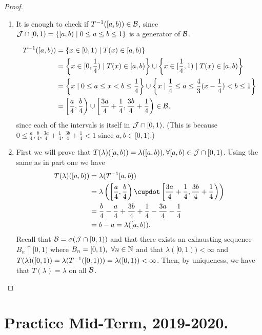 \begin{proof}$ $\newline
	\begin{enumerate}
		\item It is enough to check if ${T}^{-1}([a,b)) \in \mathcal{B}$, since $\mathcal{J} \cap [0, 1) = \{[a, b) \mid 0 \leq a \leq b \leq 1\}$ is a generator of $\mathcal{B}$.
		
		\begin{align*}
		{T}^{-1}([a,b)) &= \{x \in [0, 1) \mid T(x) \in [a, b)\} \\
		&= \left\{x \in [0, \frac{1}{4}) \mid T(x) \in [a, b)\right\} \cup \left\{x \in [\frac{1}{4}, 1) \mid T(x) \in [a, b)\right\} \\
		&= \left\{x \mid 0 \leq a \leq x < b \leq \frac{1}{4}\right\} \cup \left\{x \mid \frac{1}{4} \leq a \leq \frac{4}{3}( x - \frac{1}{4}) < b \leq 1\right\} \\
		&= \left[\frac{a}{4}, \frac{b}{4}\right) \cup \left[\frac{3a}{4} + \frac{1}{4}, \frac{3b}{4} + \frac{1}{4}\right) \in \mathcal{B},
		\end{align*}
		since each of the intervals is itself in $\mathcal{J} \cap [0,1)$. (This is because $0 \leq \frac{a}{4}, \frac{b}{4}, \frac{3a}{4} + \frac{1}{4}, \frac{3b}{4} + \frac{1}{4} < 1$ since $a, b \in [0, 1)$.)
		
		\item First we will prove that $T(\lambda)([a, b)) = \lambda([a, b)), \forall [a, b) \in \mathcal{J} \cap [0,1)$. Using the same as in part one we have
		\begin{align*}
		T(\lambda)([a, b)) &= \lambda(\inv{T}[a,b))\\
		&= \lambda\left(\left[\frac{a}{4}, \frac{b}{4}\right) \cupdot \left[\frac{3a}{4} + \frac{1}{4}, \frac{3b}{4} + \frac{1}{4}\right)\right) \\
		&= \frac{b}{4} - \frac{a}{4} + \frac{3b}{4} + \frac{1}{4} - \frac{3a}{4} - \frac{1}{4} \\
		&= b - a = \lambda([a, b)).
		\end{align*} 
		Recall that $\mathcal{B} = \sigma(\mathcal{J} \cap [0,1))$ and that there exists an exhausting sequence $B_n \uparrow [0,1)$ where $B_n = [0,1),\ \forall n \in \mathbb{N}$ and that $\lambda([0, 1)) < \infty$ and $T(\lambda)([0,1)) = \lambda({T}^{-1}([0,1))) = \lambda([0,1)) < \infty$. Then, by uniqueness, we have that $T(\lambda) = \lambda$ on all $\mathcal{B}$.
	\end{enumerate}
\end{proof}

\section{Practice Mid-Term, 2019-2020.}

